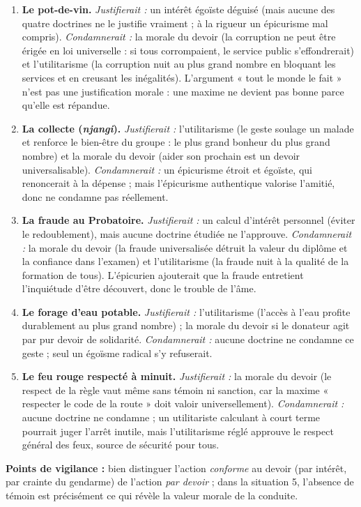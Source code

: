 \documentclass[11pt]{article}
\begin{document}
\begin{corrige}
\begin{enumerate}
\item \textbf{Le pot-de-vin.} \emph{Justifierait :} un intérêt égoïste déguisé (mais aucune des quatre doctrines ne le justifie vraiment ; à la rigueur un épicurisme mal compris). \emph{Condamnerait :} la morale du devoir (la corruption ne peut être érigée en loi universelle : si tous corrompaient, le service public s'effondrerait) et l'utilitarisme (la corruption nuit au plus grand nombre en bloquant les services et en creusant les inégalités). L'argument « tout le monde le fait » n'est pas une justification morale : une maxime ne devient pas bonne parce qu'elle est répandue.
\item \textbf{La collecte (\emph{njangi}).} \emph{Justifierait :} l'utilitarisme (le geste soulage un malade et renforce le bien-être du groupe : le plus grand bonheur du plus grand nombre) et la morale du devoir (aider son prochain est un devoir universalisable). \emph{Condamnerait :} un épicurisme étroit et égoïste, qui renoncerait à la dépense ; mais l'épicurisme authentique valorise l'amitié, donc ne condamne pas réellement.
\item \textbf{La fraude au Probatoire.} \emph{Justifierait :} un calcul d'intérêt personnel (éviter le redoublement), mais aucune doctrine étudiée ne l'approuve. \emph{Condamnerait :} la morale du devoir (la fraude universalisée détruit la valeur du diplôme et la confiance dans l'examen) et l'utilitarisme (la fraude nuit à la qualité de la formation de tous). L'épicurien ajouterait que la fraude entretient l'inquiétude d'être découvert, donc le trouble de l'âme.
\item \textbf{Le forage d'eau potable.} \emph{Justifierait :} l'utilitarisme (l'accès à l'eau profite durablement au plus grand nombre) ; la morale du devoir si le donateur agit par pur devoir de solidarité. \emph{Condamnerait :} aucune doctrine ne condamne ce geste ; seul un égoïsme radical s'y refuserait.
\item \textbf{Le feu rouge respecté à minuit.} \emph{Justifierait :} la morale du devoir (le respect de la règle vaut même sans témoin ni sanction, car la maxime « respecter le code de la route » doit valoir universellement). \emph{Condamnerait :} aucune doctrine ne condamne ; un utilitariste calculant à court terme pourrait juger l'arrêt inutile, mais l'utilitarisme réglé approuve le respect général des feux, source de sécurité pour tous.
\end{enumerate}
\textbf{Points de vigilance :} bien distinguer l'action \emph{conforme} au devoir (par intérêt, par crainte du gendarme) de l'action \emph{par devoir} ; dans la situation 5, l'absence de témoin est précisément ce qui révèle la valeur morale de la conduite.
\end{corrige}
\end{document}
